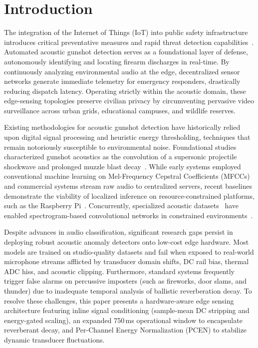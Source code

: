 \documentclass[conference]{IEEEtran}
\begin{document}
\section{Introduction}
\label{sec:intro}

The integration of the Internet of Things (IoT) into public safety infrastructure introduces critical preventative measures and rapid threat detection capabilities~\cite{simon2004}. Automated acoustic gunshot detection serves as a foundational layer of defense, autonomously identifying and locating firearm discharges in real-time. By continuously analyzing environmental audio at the edge, decentralized sensor networks generate immediate telemetry for emergency responders, drastically reducing dispatch latency. Operating strictly within the acoustic domain, these edge-sensing topologies preserve civilian privacy by circumventing pervasive video surveillance across urban grids, educational campuses, and wildlife reserves.

Existing methodologies for acoustic gunshot detection have historically relied upon digital signal processing and heuristic energy thresholding, techniques that remain notoriously susceptible to environmental noise. Foundational studies characterized gunshot acoustics as the convolution of a supersonic projectile shockwave and prolonged muzzle blast decay~\cite{maher2007}. While early systems employed conventional machine learning on Mel-Frequency Cepstral Coefficients (MFCCs) and commercial systems stream raw audio to centralized servers, recent baselines demonstrate the viability of localized inference on resource-constrained platforms, such as the Raspberry Pi~\cite{valero2020}. Concurrently, specialized acoustic datasets~\cite{dib2023, salamon2014} have enabled spectrogram-based convolutional networks in constrained environments~\cite{saha2025}.

Despite advances in audio classification, significant research gaps persist in deploying robust acoustic anomaly detectors onto low-cost edge hardware. Most models are trained on studio-quality datasets and fail when exposed to real-world microphone streams afflicted by transducer domain shifts, DC rail bias, thermal ADC hiss, and acoustic clipping. Furthermore, standard systems frequently trigger false alarms on percussive imposters (such as fireworks, door slams, and thunder) due to inadequate temporal analysis of ballistic reverberation decay. To resolve these challenges, this paper presents a hardware-aware edge sensing architecture featuring inline signal conditioning (sample-mean DC stripping and energy-gated scaling), an expanded 750\,ms operational window to encapsulate reverberant decay, and Per-Channel Energy Normalization (PCEN) to stabilize dynamic transducer fluctuations.
\end{document}
